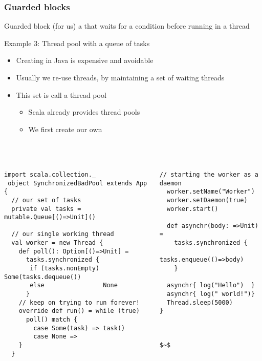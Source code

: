 \documentclass[aspectratio=169]{beamer}
\begin{document}
\begin{frame}\frametitle{Guarded blocks}
\begin{alertblock}{Guarded block (for us)}
  a  that \alert{waits for a condition} before running in a thread
\end{alertblock}

\begin{block}{Example 3: Thread pool with a queue of tasks}
  \begin{itemize}
    \item Creating  in Java is \alert{expensive} and \alert{avoidable}
    \item Usually we re-use threads, by maintaining a set of waiting threads
    \item This set is call a thread pool
      \begin{itemize}
        \item Scala already provides thread pools
        \item We first create our own
      \end{itemize}
  \end{itemize}
\end{block}
\end{frame}


\begin{frame}[fragile]\frametitle{}
~\\[-8mm]
\begin{columns}
\begin{column}{0.65\textwidth}
\begin{lstlisting}[emph={synchronized,printUniqueIds,sleep,log,thread,join}]
 import scala.collection._
 object SynchronizedBadPool extends App {
  // our set of tasks
  private val tasks = mutable.Queue[()=>Unit]()
 
  // our single working thread
  val worker = new Thread {
    def poll(): Option[()=>Unit] = 
      tasks.synchronized {
       if (tasks.nonEmpty) Some(tasks.dequeue())
       else                None
      }
    // keep on trying to run forever!
    override def run() = while (true)
      poll() match {
        case Some(task) => task()
        case None =>
    }
  }
\end{lstlisting}
\end{column}
\begin{column}{0.40\textwidth}
\begin{lstlisting}[mathescape,emph={synchronized,sleep,log,thread,join}]
  // starting the worker as a daemon
  worker.setName("Worker")
  worker.setDaemon(true)
  worker.start()

  def asynchr(body: =>Unit) =
    tasks.synchronized {
      tasks.enqueue(()=>body)
    }

  asynchr{ log("Hello")  }
  asynchr{ log(" world!")}
  Thread.sleep(5000)
}



$~$
\end{lstlisting}
\end{column}
\end{columns}
\end{frame}
\end{document}
